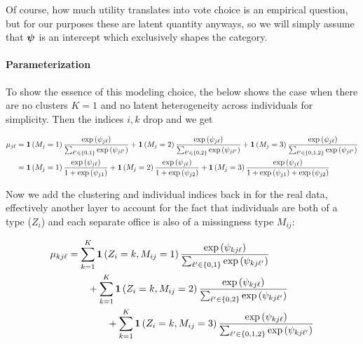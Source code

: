 \documentclass[11pt]{article}
\begin{document}
Of course, how much utility translates into vote choice is an empirical question, but for our purposes these are latent quantity anyways, so we will simply assume that \(\bm{\psi}\) is an intercept which exclusively shapes the category.


\paragraph{Parameterization} To show the essence of this modeling choice, the below shows the case when there are no clusters \(K = 1\) and no latent heterogeneity across individuals for simplicity. Then the indices \(i, k\) drop and we get

\begin{align}
\mu_{j\ell} &= \bm{1}\left(M_{j}= 1\right)\frac{\exp{(\psi_{j\ell}})}{\sum_{\ell^\prime \in \{0, 1\}}\exp{(\psi_{j\ell^\prime})}} +\bm{1}\left(M_{j}= 2\right)\frac{\exp{(\psi_{j\ell})}}{\sum_{\ell^\prime \in \{0, 2\}}\exp{(\psi_{j\ell^\prime}})}\nonumber +\bm{1}\left(M_{j}= 3\right)\frac{\exp{(\psi_{j\ell}})}{\sum_{\ell^\prime \in \{0, 1, 2\}}\exp{(\psi_{j\ell^\prime}})}\nonumber\\
&= \bm{1}\left(M_{j}= 1\right)\frac{\exp{(\psi_{j\ell})}}{1 + \exp{(\psi_{j1})}} +\bm{1}\left(M_{j}= 2\right)\frac{\exp{(\psi_{j\ell})}}{1 + \exp{(\psi_{j2})}} +\bm{1}\left(M_{j}= 3\right)\frac{\exp{(\psi_{j\ell})}}{1 + \exp{(\psi_{j1})} + \exp{(\psi_{j2}})}\nonumber
\end{align}

Now we add the clustering and individual indices back in for the real data, effectively another layer to account for the fact that individuals are both of a type (\(Z_i\)) and each separate office is also of a missingness type \(M_{ij}\):


\begin{align}
\mu_{kj\ell} &= \sum^K_{k=1}\bm{1}\left(Z_i = k, M_{ij}= 1\right)\frac{\exp{(\psi_{kj\ell})}}{\sum_{\ell^\prime \in \{0, 1\}}\exp{(\psi_{kj\ell^\prime})}}\nonumber \\
&\qquad +\sum^K_{k=1}\bm{1}\left(Z_i = k, M_{ij}= 2\right)\frac{\exp{(\psi_{kj\ell})}}{\sum_{\ell^\prime \in \{0, 2\}}\exp{(\psi_{kj\ell^\prime})}}\nonumber \\
&\qquad\qquad +\sum^K_{k=1}\bm{1}\left(Z_i = k, M_{ij}= 3\right)\frac{\exp{(\psi_{kj\ell})}}{\sum_{\ell^\prime \in \{0, 1, 2\}}\exp{(\psi_{kj\ell^\prime})}}\label{eq:missing}
\end{align}
\end{document}
